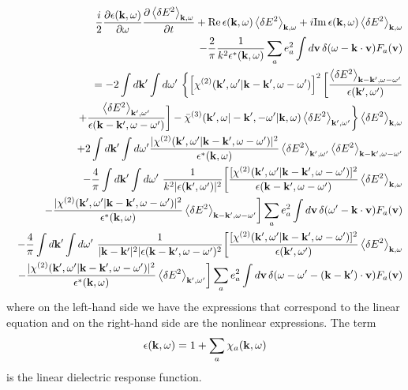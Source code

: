 \documentclass[12pt,a4paper,ruledheader]{report}
\begin{document}
\begin{eqnarray}
  &&\frac{i}{2}\frac{\partial \epsilon({\bf k},\omega)}{\partial \omega}
  \frac{\partial \left<\delta E^2\right>_{{\bf k},\omega}}{\partial t}
  +\mbox{Re}\,\epsilon({\bf k},\omega)\left<\delta E^2 \right>_{{\bf k},\omega}
+i\mbox{Im}\,\epsilon({\bf k},\omega)\left<\delta E^2 \right>_{{\bf k},\omega}
  \nonumber\\
  &&\qquad \qquad \qquad -\frac{2}{\pi}\frac{1}{k^2\epsilon^*({\bf k},\omega)}
     \sum_ae_a^2\int d{\bf v}\,\delta(\omega-{\bf k\cdot v})F_a({\bf v})
  \nonumber\\
  &&=-2\int d{\bf k'} \int d\omega '\
  \biggl\{ \left[\chi^{(2)}({\bf k'},\omega '|{\bf k-k'},
    \omega-\omega ')\right]^2
  \biggl[\frac{\left<\delta E^2\right>_{{\bf k-k'},\omega-\omega '}}
       {\epsilon({\bf k'},\omega ')}
  \nonumber\\
  &&+\frac{\left<\delta E^2\right>_{{\bf k'},\omega '}}
  {\epsilon({\bf k-k'},\omega-\omega ')}\biggr]
     -\bar \chi^{(3)}({\bf k'},\omega|-{\bf k'},-\omega '|{\bf k},\omega)
      \left<\delta E^2\right>_{{\bf k'},\omega'}\biggr\}
  \left<\delta E^2\right>_{{\bf k},\omega}\nonumber\\
  &&+2\int d{\bf k'} \int d\omega '
  \frac{|\chi^{(2)}({\bf k'},\omega '|{\bf k-k'},\omega-\omega ')|^2}
{\epsilon^*({\bf k},\omega)}
\left<\delta E^2\right>_{{\bf k'},\omega '}
     \left<\delta E^2\right>_{{\bf k-k'},\omega-\omega '}
  \label{nlebe}\\
&&-\frac{4}{\pi}\int d{\bf k '} \int d\omega '\
\frac{1}{k^2|\epsilon({\bf k'},\omega ')|^2}
\biggl[ \frac{[\chi^{(2)}({\bf k'},\omega '|{\bf k-k'},\omega-\omega ')]^2}
{\epsilon({\bf k-k'},\omega-\omega ')}
    \left<\delta E^2 \right>_{{\bf k},\omega}
  \nonumber\\
&&-\frac{|\chi^{(2)}({\bf k'},\omega '|{\bf k-k'},\omega-\omega ')|^2}
{\epsilon^*({\bf k},\omega)}
\left<\delta E^2 \right>_{{\bf k-k'},\omega-\omega '}\biggr]
\sum_ae_a^2\int d{\bf v}\, \delta(\omega '-{\bf k \cdot v})F_a({\bf v})
  \nonumber\\
&&-\frac{4}{\pi}\int d{\bf k '} \int d\omega '\
\frac{1}{|{\bf k - k'}|^2|\epsilon({\bf k-k'},\omega-\omega ')^2}
\biggl[ \frac{[\chi^{(2)}({\bf k'},\omega '|{\bf k-k'},\omega-\omega ')]^2}
{\epsilon({\bf k'},\omega ')}\left<\delta E^2 \right>_{{\bf k},\omega}
  \nonumber\\
&&-\frac{|\chi^{(2)}({\bf k'},\omega '|{\bf k-k'},\omega-\omega ')|^2}
{\epsilon^*({\bf k},\omega)}
\left<\delta E^2 \right>_{{\bf k'},\omega '}\biggr]
\sum_ae_a^2\int d{\bf v}\, \delta(\omega-\omega '-{\bf (k-k')\cdot v})F_a({\bf v})
\nonumber
\end{eqnarray}
where on the left-hand side we have the expressions that correspond
to the linear equation and on the right-hand side are the nonlinear
expressions. The term
\begin{equation} 
\epsilon({\bf k},\omega)=1+\sum_a\chi_a({\bf k},\omega)
\end{equation}
is the linear dielectric response function.
\end{document}
